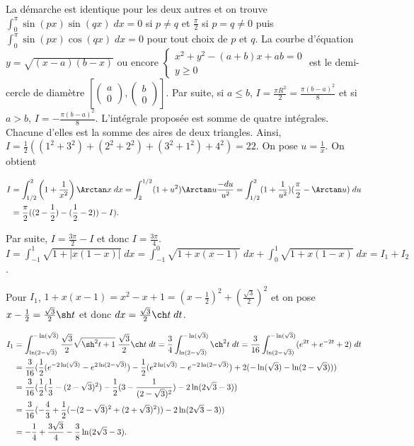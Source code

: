 {{La démarche est identique pour les deux autres et on trouve $\int_{0}^{\pi}\sin(px)\sin(qx)\;dx=0$ si $p\neq q$ et $\frac{\pi}{2}$ si $p=q\neq0$ puis $\int_{0}^{\pi}\sin(px)\cos(qx)\;dx=0$ pour tout choix de $p$ et $q$.
La courbe d'équation $y=\sqrt{(x-a)(b-x)}$ ou encore $\left\{
\begin{array}{l}
x^2+y^2-(a+b)x+ab=0\\
y\geq0
\end{array}
\right.$ est le demi-cercle de diamètre $[\left(\begin{array}{c}
a\\
0
\end{array}
\right),\left(\begin{array}{c}
b\\
0
\end{array}
\right)]$. Par suite, si $a\leq b$, $I=\frac{\pi R^2}{2}=\frac{\pi(b-a)^2}{8}$ et si $a>b$, $I=-\frac{\pi(b-a)^2}{8}$.
L'intégrale proposée est somme de quatre intégrales. Chacune d'elles est la somme des aires de deux triangles. Ainsi, $I=\frac{1}{2}((1^2+3^2)+(2^2+2^2)+(3^2+1^2)+4^2)=22$.
On pose $u=\frac{1}{x}$. On obtient

\begin{align*}\ensuremath
I&=\int_{1/2}^{2}\left(1+\frac{1}{x^2}\right)\Arctan x\;dx=\int_{2}^{1/2}(1+u^2)\Arctan u\frac{-du}{u^2}=\int_{1/2}^{2}(1+\frac{1}{u^2})(\frac{\pi}{2}-\Arctan u)\;du\\
 &=\frac{\pi}{2}((2-\frac{1}{2})-(\frac{1}{2}-2))-I).
\end{align*}

Par suite, $I=\frac{3\pi}{2}-I$ et donc $I=\frac{3\pi}{4}$.
$I=\int_{-1}^{1}\sqrt{1+|x(1-x)|}\;dx=\int_{-1}^{0}\sqrt{1+x(x-1)}\;dx+\int_{0}^{1}\sqrt{1+x(1-x)}\;dx=I_1+I_2$.

Pour $I_1$, $1+x(x-1)=x^2-x+1=(x-\frac{1}{2})^2+(\frac{\sqrt{3}}{2})^2$ et on pose $x-\frac{1}{2}=\frac{\sqrt{3}}{2}\sh t$ et donc $dx=\frac{\sqrt{3}}{2}\ch t\;dt$.

\begin{align*}\ensuremath
I_1&=\int_{\ln(2-\sqrt{3})}^{-\ln(\sqrt{3})}\frac{\sqrt{3}}{2}\sqrt{\sh^2t+1}\;\frac{\sqrt{3}}{2}\ch t\;dt=
\frac{3}{4}\int_{\ln(2-\sqrt{3})}^{-\ln(\sqrt{3})}\ch^2t\;dt=\frac{3}{16}\int_{\ln(2-\sqrt{3})}^{-\ln(\sqrt{3})}(e^{2t}+e^{-2t}+2)\;dt\\
 &=\frac{3}{16}(\frac{1}{2}(e^{-2\ln(\sqrt{3})}-e^{2\ln(2-\sqrt{3})})-\frac{1}{2}(e^{2\ln(\sqrt{3})}-e^{-2\ln(2-\sqrt{3})})+2(-\ln(\sqrt{3})-\ln(2-\sqrt{3})))\\
 &=\frac{3}{16}(\frac{1}{2}(\frac{1}{3}-(2-\sqrt{3})^2)-\frac{1}{2}(3-\frac{1}{(2-\sqrt{3})^2})-2\ln(2\sqrt{3}-3))\\
 &=\frac{3}{16}(-\frac{4}{3}+\frac{1}{2}(-(2-\sqrt{3})^2+(2+\sqrt{3})^2))-2\ln(2\sqrt{3}-3))\\
 &=-\frac{1}{4}+\frac{3\sqrt{3}}{4}-\frac{3}{8}\ln(2\sqrt{3}-3).
\end{align*}

}}
